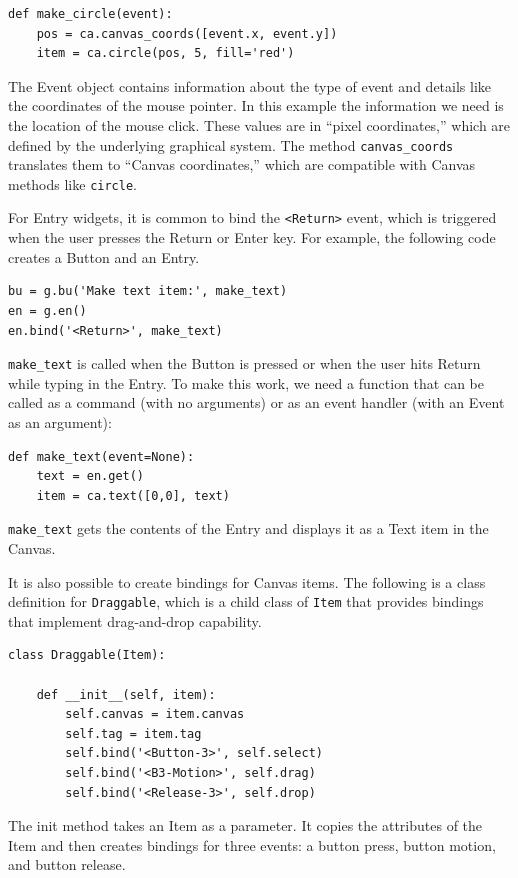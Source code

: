 \documentclass[10pt]{book}
\begin{document}
\begin{CJK}{UTF8}{gbsn}
\begin{verbatim}
def make_circle(event):
    pos = ca.canvas_coords([event.x, event.y])
    item = ca.circle(pos, 5, fill='red')
\end{verbatim}
%
The Event object contains information about the type of event and
details like the coordinates of the mouse pointer.  In this example
the information we need is
the location of the mouse click.  These
values are in ``pixel coordinates,'' which are defined by the
underlying graphical system.  The method \verb"canvas_coords"
translates them to ``Canvas coordinates,'' which are compatible with
Canvas methods like {\tt circle}.

For Entry widgets, it is common to bind the \verb"<Return>" event,
which is triggered when the user presses the {\sf Return} or
{\sf Enter} key.  For example, the following code creates a Button
and an Entry.

\begin{verbatim}
bu = g.bu('Make text item:', make_text)
en = g.en()
en.bind('<Return>', make_text)
\end{verbatim}
%
\verb"make_text" is called when the Button is pressed or when
the user hits {\sf Return} while typing in the Entry.  To make
this work, we need a function that can be called as a command
(with no arguments) or as an event handler (with an Event
as an argument):

\begin{verbatim}
def make_text(event=None):
    text = en.get()
    item = ca.text([0,0], text)
\end{verbatim}
%
\verb"make_text" gets the contents of the Entry and displays
it as a Text item in the Canvas.

It is also possible to create bindings for Canvas items.
The following is a class definition for {\tt Draggable},
which is a child class of {\tt Item} that provides bindings
that implement drag-and-drop capability.

\begin{verbatim}
class Draggable(Item):

    def __init__(self, item):
        self.canvas = item.canvas
        self.tag = item.tag
        self.bind('<Button-3>', self.select)
        self.bind('<B3-Motion>', self.drag)
        self.bind('<Release-3>', self.drop)
\end{verbatim}
%
The init method takes an Item as a parameter.  It copies
the attributes of the Item and then creates bindings for
three events: a button press, button motion, and button release.


\end{CJK}
\end{document}
